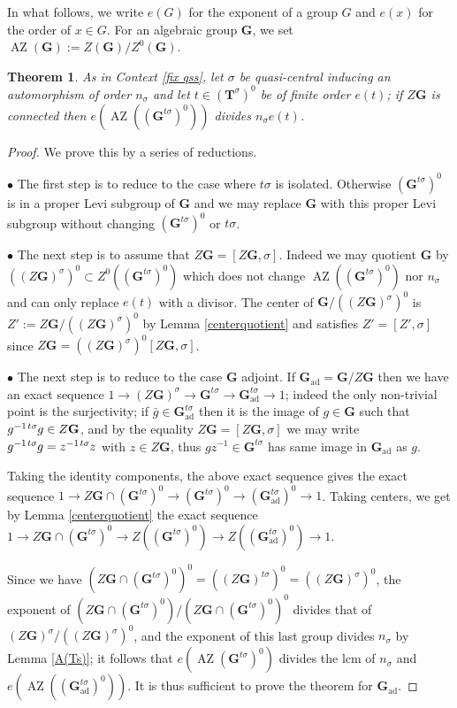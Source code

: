 \documentclass{amsart}
\newtheorem{theorem}[equation]{Theorem}
\numberwithin{equation}{section}
\theoremstyle{definition}
\theoremstyle{remark}
\newcommand\bG{{\mathbf G}}
\newcommand\bT{{\mathbf T}}
\newcommand\Gtso{{(\bG^{t\sigma})^0}}
\newcommand\Gts{{\bG^{t\sigma}}}
\newcommand\Tso{{(\bT^\sigma)^0}}
\newcommand\lexp[2]{\kern\scriptspace\vphantom{#2}^{#1}\kern-\scriptspace#2}
\newcommand\inv{^{-1}}
\DeclareMathOperator\AZ{\mathrm{AZ}}
\newcommand\ad{\mathrm{ad}}
\begin{document}
In what follows, we write $e(G)$ for the exponent of a group $G$ and
$e(x)$ for the order of $x\in G$. For an algebraic group $\bG$,
we set $\AZ(\bG):=Z(\bG)/Z^0(\bG)$.
\index{AZ@$\AZ$}
\begin{theorem}\label{A(ZGtso)} As in Context \ref{fix qss},
let $\sigma$ be quasi-central inducing an automorphism of order
$n_\sigma$ and let $t\in\Tso$ be of finite order $e(t)$;
if $Z\bG$ is connected then $e(\AZ(\Gtso))$ divides $n_\sigma e(t)$.
\end{theorem}
\begin{proof}
We prove this by a series of reductions.

$\bullet$ The first step is to reduce to the case where $t\sigma$ is isolated.
Otherwise $\Gtso$ is in a proper Levi subgroup of $\bG$ and we may replace
$\bG$ with this proper Levi subgroup without changing $\Gtso$ or $t\sigma$.

$\bullet$ The next step is to assume that $Z\bG=[Z\bG,\sigma]$.
Indeed we may quotient $\bG$ by $((Z\bG)^\sigma)^0\subset Z^0(\Gtso)$
which does not change $\AZ(\Gtso)$ nor $n_\sigma $ and can only replace $e(t)$ with a
divisor. The center of $\bG/((Z\bG)^\sigma)^0$ is
$Z':=Z\bG/((Z\bG)^\sigma)^0$  by  Lemma  \ref{centerquotient}  and satisfies
$Z'=[Z',\sigma]$ since $Z\bG=((Z\bG)^\sigma)^0[Z\bG,\sigma]$.

$\bullet$  The  next  step  is  to  reduce  to  the  case $\bG$ adjoint. If
$\bG_\ad=\bG/Z\bG$ then we have an exact sequence $1\to  (Z\bG)^\sigma\to
\Gts\to\bG_\ad^{t\sigma}\to  1$;  indeed  the  only non-trivial point is the
surjectivity;  if  $\bar  g\in\bG_\ad^{t\sigma}$ then it is the image  of
$g\in\bG$  such that  $g\inv\lexp{t\sigma}g\in Z\bG$,  and by  the equality
$Z\bG=[Z\bG,\sigma]$ we may write $g\inv
\lexp{t\sigma}g=z\inv\lexp{t\sigma}z$  with  $z\in  Z\bG$,  thus $gz\inv\in
\Gts$ has same image in $\bG_\ad$ as $g$.

Taking the identity components, the above exact sequence gives the exact
sequence 
$1\to Z\bG\cap\Gtso\to \Gtso\to (\bG_\ad^{t\sigma})^0\to 1$.
Taking centers, we get by Lemma \ref{centerquotient} the exact sequence
$1\to  Z\bG\cap\Gtso\to  Z(\Gtso)\to Z((\bG_\ad^{t\sigma})^0)\to 1$.

Since we have $(Z\bG\cap\Gtso)^0=((Z\bG)^{t\sigma})^0=((Z\bG)^\sigma)^0$,
the exponent of $(Z\bG\cap\Gtso)/(Z\bG\cap\Gtso)^0$ divides that
of $(Z\bG)^\sigma/((Z\bG)^\sigma)^0$,
and the exponent of this last group divides $n_\sigma $ by
Lemma \ref{A(Ts)}; it follows that $e(\AZ\Gtso)$ divides the lcm
of  $n_\sigma $ and $e(\AZ((\bG_\ad^{t\sigma})^0))$.
It is thus sufficient to prove the theorem for $\bG_\ad$.


\end{proof}
\end{document}
